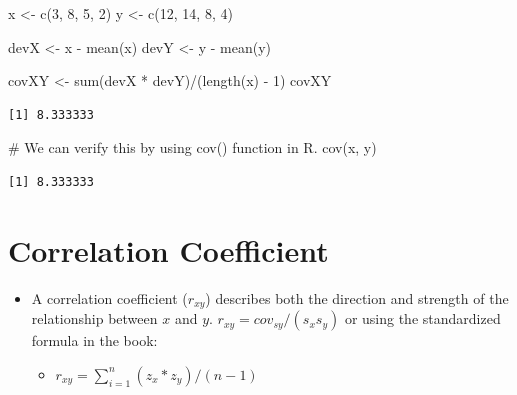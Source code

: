 \documentclass[
  letterpaper,
  DIV=11,
  numbers=noendperiod]{scrreprt}
\newenvironment{Shaded}{\begin{snugshade}}{\end{snugshade}}
\newcommand{\CommentTok}[1]{\textcolor[rgb]{0.37,0.37,0.37}{#1}}
\newcommand{\DecValTok}[1]{\textcolor[rgb]{0.68,0.00,0.00}{#1}}
\newcommand{\FunctionTok}[1]{\textcolor[rgb]{0.28,0.35,0.67}{#1}}
\newcommand{\NormalTok}[1]{\textcolor[rgb]{0.00,0.23,0.31}{#1}}
\newcommand{\OtherTok}[1]{\textcolor[rgb]{0.00,0.23,0.31}{#1}}
\newcommand{\SpecialCharTok}[1]{\textcolor[rgb]{0.37,0.37,0.37}{#1}}
\providecommand{\tightlist}{%
  \setlength{\itemsep}{0pt}\setlength{\parskip}{0pt}}\usepackage{longtable,booktabs,array}
\begin{document}
\begin{Shaded}
\begin{Highlighting}[]
\NormalTok{x }\OtherTok{\textless{}{-}} \FunctionTok{c}\NormalTok{(}\DecValTok{3}\NormalTok{, }\DecValTok{8}\NormalTok{, }\DecValTok{5}\NormalTok{, }\DecValTok{2}\NormalTok{)}
\NormalTok{y }\OtherTok{\textless{}{-}} \FunctionTok{c}\NormalTok{(}\DecValTok{12}\NormalTok{, }\DecValTok{14}\NormalTok{, }\DecValTok{8}\NormalTok{, }\DecValTok{4}\NormalTok{)}

\NormalTok{devX }\OtherTok{\textless{}{-}}\NormalTok{ x }\SpecialCharTok{{-}} \FunctionTok{mean}\NormalTok{(x)}
\NormalTok{devY }\OtherTok{\textless{}{-}}\NormalTok{ y }\SpecialCharTok{{-}} \FunctionTok{mean}\NormalTok{(y)}

\NormalTok{covXY }\OtherTok{\textless{}{-}} \FunctionTok{sum}\NormalTok{(devX }\SpecialCharTok{*}\NormalTok{ devY)}\SpecialCharTok{/}\NormalTok{(}\FunctionTok{length}\NormalTok{(x) }\SpecialCharTok{{-}} \DecValTok{1}\NormalTok{)}
\NormalTok{covXY}
\end{Highlighting}
\end{Shaded}

\begin{verbatim}
[1] 8.333333
\end{verbatim}

\begin{Shaded}
\begin{Highlighting}[]
\CommentTok{\# We can verify this by using cov() function in R.}
\FunctionTok{cov}\NormalTok{(x, y)}
\end{Highlighting}
\end{Shaded}

\begin{verbatim}
[1] 8.333333
\end{verbatim}

\section{Correlation Coefficient}\label{correlation-coefficient}

\begin{itemize}
\tightlist
\item
  A correlation coefficient (\(r_{xy}\)) describes both the direction
  and strength of the relationship between \(x\) and \(y\).
  \(r_{xy} = cov_{sy}/(s_xs_y)\) or using the standardized formula in
  the book:

  \begin{itemize}
  \tightlist
  \item
    \(r_{xy} = \sum^n_{i=1}(z_x*z_y)/(n-1)\)
  \end{itemize}
\end{itemize}
\end{document}
